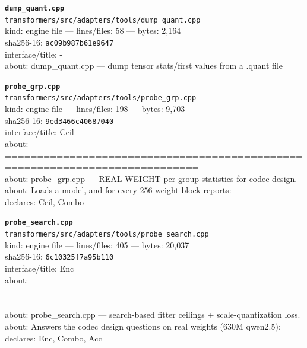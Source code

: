 \noindent\textbf{\texttt{dump\_quant.cpp}}\\
\texttt{transformers/src/adapters/tools/dump\_quant.cpp}\\
kind: engine file --- lines/files: 58 --- bytes: 2,164\\
sha256-16: \texttt{ac09b987b61e9647}\\
interface/title: -\\
about: dump\_quant.cpp — dump tensor stats/first values from a .quant file\\
\vspace*{6.0pt}

\noindent\textbf{\texttt{probe\_grp.cpp}}\\
\texttt{transformers/src/adapters/tools/probe\_grp.cpp}\\
kind: engine file --- lines/files: 198 --- bytes: 9,703\\
sha256-16: \texttt{9ed3466c40687040}\\
interface/title: Ceil\\
about: ============================================================================\\
about: probe\_grp.cpp — REAL-WEIGHT per-group statistics for codec design.\\
about: Loads a model, and for every 256-weight block reports:\\
declares: Ceil, Combo\\
\vspace*{6.0pt}

\noindent\textbf{\texttt{probe\_search.cpp}}\\
\texttt{transformers/src/adapters/tools/probe\_search.cpp}\\
kind: engine file --- lines/files: 405 --- bytes: 20,037\\
sha256-16: \texttt{6c10325f7a95b110}\\
interface/title: Enc\\
about: ============================================================================\\
about: probe\_search.cpp — search-based fitter ceilings + scale-quantization loss.\\
about: Answers the codec design questions on real weights (630M qwen2.5):\\
declares: Enc, Combo, Acc\\
\vspace*{6.0pt}

